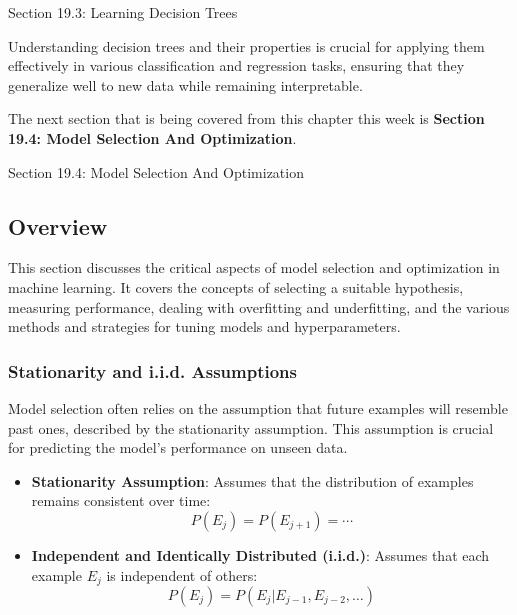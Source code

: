 \begin{notes}{Section 19.3: Learning Decision Trees}
\begin{highlight}
        Understanding decision trees and their properties is crucial for applying them effectively in various classification and regression tasks, ensuring that they generalize well to new data while remaining interpretable.
    
    \end{highlight}
\end{notes}

The next section that is being covered from this chapter this week is \textbf{Section 19.4: Model Selection And Optimization}.

\begin{notes}{Section 19.4: Model Selection And Optimization}
    \subsection*{Overview}

    This section discusses the critical aspects of model selection and optimization in machine learning. It covers the concepts of selecting a suitable hypothesis, measuring performance, dealing with 
    overfitting and underfitting, and the various methods and strategies for tuning models and hyperparameters.
    
    \subsubsection*{Stationarity and i.i.d. Assumptions}
    
    Model selection often relies on the assumption that future examples will resemble past ones, described by the stationarity assumption. This assumption is crucial for predicting the model's performance 
    on unseen data.
    
    \begin{highlight}
    
        \begin{itemize}
            \item \textbf{Stationarity Assumption}: Assumes that the distribution of examples remains consistent over time:
            \[
            P(E_j) = P(E_{j+1}) = \cdots
            \]
            \item \textbf{Independent and Identically Distributed (i.i.d.)}: Assumes that each example $E_j$ is independent of others:
            \[
            P(E_j) = P(E_j|E_{j-1}, E_{j-2}, \ldots)
            \]
        \end{itemize}
    

\end{highlight}
\end{notes}
